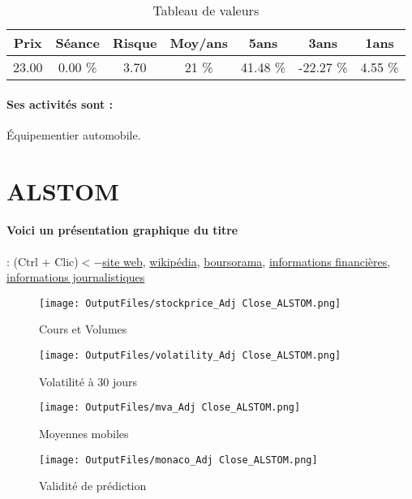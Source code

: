 \documentclass[11pt,a4paper]{report}%
\begin{document}
\begin{table}[H]
  \centering
    \begin{tabular}{|c|c|c|c|c|c|c|}
    \hline
    Prix & Séance & Risque  & Moy/ans & 5ans & 3ans & 1ans \\
    \hline
    23.00 &    0.00 \%    & 3.70 & 21 \% & 41.48 \% & -22.27 \% & 4.55 \% \\
    \hline
    \end{tabular}%
        \label{tab:table_AKWEL}%
      \caption{Tableau de valeurs}
\end{table}%

\paragraph{Ses activités sont : } Équipementier automobile. 
    
    \newpage

\section{ALSTOM}

\paragraph{Voici un présentation graphique du titre} : (Ctrl + Clic)$<-$\href{https://www.alstom.com/fr/finance}{site web}, \href{https://fr.wikipedia.org/wiki/Alstom}{wikipédia}, \href{https://www.boursorama.com/cours/1rPALO}{boursorama}, \href{https://www.qwant.com/?q=site:https:%2f%2fwww.easybourse.com%2faction-societe%2fALSTOM&t=web&client=ext-firefox-hp}{informations financières}, \href{https://bourse.lerevenu.com/cours-de-bourse/fiche-valeur-synthese/ALSTOM/ALO-FR}{informations journalistiques}
\begin{figure}[!htb]
   \begin{minipage}{0.5\textwidth}
     \centering
     \texttt{[image: OutputFiles/stockprice\_Adj Close\_ALSTOM.png]}
     \caption{Cours et Volumes}\label{Fig:price_ALSTOM}
   \end{minipage}\hfill
   \begin{minipage}{0.5\textwidth}
     \centering
     \texttt{[image: OutputFiles/volatility\_Adj Close\_ALSTOM.png]}
     \caption{Volatilité à 30 jours}\label{Fig:volat_ALSTOM}
   \end{minipage}
\end{figure}
\begin{figure}[!htb]
   \begin{minipage}{0.5\textwidth}
     \centering
     \texttt{[image: OutputFiles/mva\_Adj Close\_ALSTOM.png]}
     \caption{Moyennes mobiles}\label{Fig:mva_ALSTOM}
   \end{minipage}\hfill
   \begin{minipage}{0.5\textwidth}
     \centering
     \texttt{[image: OutputFiles/monaco\_Adj Close\_ALSTOM.png]}
     \caption{Validité de prédiction}\label{Fig:prediction_ALSTOM}
   \end{minipage}
\end{figure}
\end{document}
